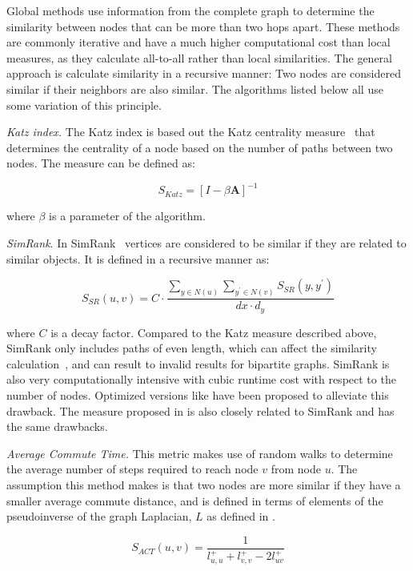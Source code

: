Global methods use information from the complete graph to determine the
similarity between nodes that can be more than two hops apart. These methods
are commonly iterative and have a much higher computational cost than local
measures, as they calculate all-to-all rather than local similarities.
The general approach is calculate similarity in a recursive manner:
Two nodes are considered similar if their neighbors are also similar.
The algorithms listed below all use some variation of this principle.

\emph{Katz index.} The Katz index \cite{vertex-similarity-survey} is based out the Katz centrality
measure~\cite{katz-index} that determines the centrality of a node
based on the number of paths between two nodes. The measure can be
defined as:

\begin{equation}
	S_{Katz} = [I - \beta \mathbf{A}]^{-1}
\end{equation}

\noindent
where $\beta$ is a parameter of the algorithm.

\emph{SimRank}. In SimRank~\cite{simrank} vertices are considered
to be similar if they are related to similar objects. It is defined
in a recursive manner as:

\begin{equation}
	S_{SR}(u, v)= C \cdot \frac{\sum_{y \in N(u)} \sum_{y^{\prime} \in N(v)} S_{SR}(y, y^{\prime})}{d{x} \cdot d_{y}}
\end{equation}

where $C$ is a decay factor. Compared to the Katz measure described above,
SimRank only includes paths of even length, which can affect the similarity
calculation~\cite{vertex-similarity-survey}, and can result to invalid results
for bipartite graphs. SimRank is also very computationally intensive with cubic
runtime cost with respect to the number of nodes. Optimized versions like
\cite{simrankOpt} have been proposed to alleviate this drawback.
The measure proposed in \citet{blondel-similarity} is also closely related to SimRank
and has the same drawbacks.

\emph{Average Commute Time.} This metric makes use of random walks to determine
the average number of steps required to reach node $v$ from node $u$. The assumption
this method makes is that two nodes are more similar if they have a smaller average
commute distance, and is defined in terms of elements of the pseudoinverse of the
graph Laplacian, $L$ as defined in \cite{link-prediction-survey}.

\begin{equation}
	S_{ACT}(u, v)=\frac{1}{l_{u, u}^{+}+l_{v, v}^{+}-2 l_{uv}^{+}}
\end{equation}
